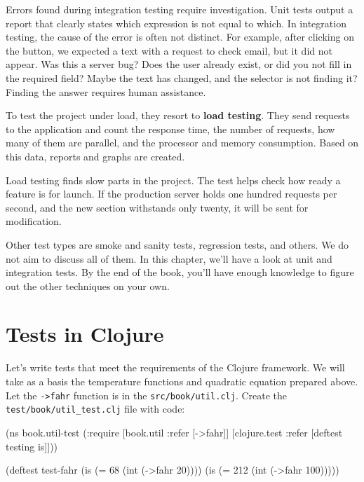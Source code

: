 Errors found during integration testing require investigation. Unit tests output a report that clearly states which expression is not equal to which. In integration testing, the cause of the error is often not distinct. For example, after clicking on the button, we expected a text with a request to check email, but it did not appear. Was this a server bug? Does the user already exist, or did you not fill in the required field? Maybe the text has changed, and the selector is not finding it? Finding the answer requires human assistance.


To test the project under load, they resort to \textbf{load testing}. They send requests to the application and count the response time, the number of requests, how many of them are parallel, and the processor and memory consumption. Based on this data, reports and graphs are created.


Load testing finds slow parts in the project. The test helps check how ready a feature is for launch. If the production server holds one hundred requests per second, and the new section withstands only twenty, it will be sent for modification.

Other test types are smoke and sanity tests, regression tests, and others. We do not aim to discuss all of them. In this chapter, we'll have a look at unit and integration tests. By the end of the book, you'll have enough knowledge to figure out the other techniques on your own.

\section{Tests in Clojure}

Let's write tests that meet the requirements of the Clojure framework. We will take as a basis the temperature functions and quadratic equation prepared above. Let the \verb|->fahr| function is in the \texttt{src/book/util\-.clj}. Create the \verb|test/book/util_test.clj| file with code:


\ifnarrow

\begin{english}
  \begin{clojure}
(ns book.util-test
  (:require
   [book.util :refer [->fahr]]
   [clojure.test :refer
    [deftest testing is]]))

(deftest test-fahr
  (is (= 68 (int (->fahr 20))))
  (is (= 212 (int (->fahr 100)))))
  \end{clojure}
\end{english}

